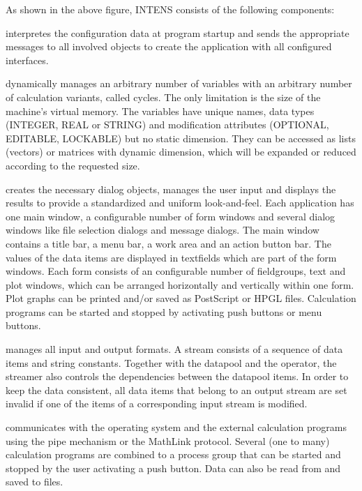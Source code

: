 As shown in the above figure, INTENS consists of the following components:
\begin{description}
\item[The Parser] interpretes the configuration data at program startup
  and sends the appropriate messages to all involved objects to create
  the application with all configured interfaces.
\item[The Datapool] dynamically manages an arbitrary number of variables
   with an arbitrary number of calculation variants, called cycles.
   The only limitation is the size of the machine's virtual memory.
   The variables have unique names, data types (INTEGER, REAL or STRING)
   and modification attributes (OPTIONAL, EDITABLE, LOCKABLE) but
   no static dimension. They can be accessed as lists (vectors) or matrices
   with dynamic dimension, which will be expanded or reduced according to
   the requested size.
\item[The UI Manager] creates the necessary dialog objects, manages
  the user input and displays the results to provide a standardized
  and uniform look-and-feel. Each application has
  one main window, a configurable number of form windows and several
  dialog windows like file selection dialogs and message dialogs.
  The main window contains
  a title bar, a menu bar, a work area and an action button bar.
  The values of the data items
  are displayed in textfields which are part of the form windows. Each form
  consists of an configurable number of fieldgroups, text and plot windows,
  which can be arranged horizontally and vertically within one form.
  Plot graphs can be printed and/or saved as PostScript or HPGL files.
  Calculation programs can be started and stopped by activating
  push buttons or menu buttons.
\item[The Streamer] manages all input and output formats. A stream consists
  of a sequence of data items and string constants. Together with the
  datapool and the operator, the streamer also controls the dependencies
  between the datapool items. In order to keep the data consistent,
  all data items that belong to an output stream are set invalid
   if one of the items of a corresponding input stream is modified.
\item[The Operator] communicates with the operating system and the
  external calculation programs using the pipe mechanism or the
  MathLink protocol. Several (one to many) calculation programs
  are combined to a process group that can be started and stopped
  by the user activating a push button. Data can also be read from
  and saved to files.
\end{description}
